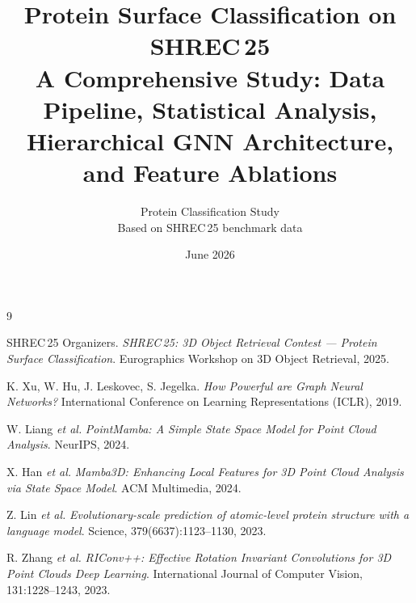 \documentclass[11pt,a4paper]{article}
\title{%
  \textbf{Protein Surface Classification on SHREC\,25}\\[0.5ex]
  \large A Comprehensive Study: Data Pipeline, Statistical Analysis,\\
  Hierarchical GNN Architecture, and Feature Ablations
}
\author{%
  Protein Classification Study\\[0.3ex]
  \small Based on SHREC\,25 benchmark data
}
\date{June 2026}
\begin{document}
\maketitle
\tableofcontents
\newpage


\newpage

\newpage

\newpage

\newpage

\newpage

\newpage

\newpage

\newpage

\newpage


\newpage

\begin{thebibliography}{9}

  SHREC\,25 Organizers.
  \textit{SHREC\,25: 3D Object Retrieval Contest --- Protein Surface
  Classification}.
  Eurographics Workshop on 3D Object Retrieval, 2025.

  K. Xu, W. Hu, J. Leskovec, S. Jegelka.
  \textit{How Powerful are Graph Neural Networks?}
  International Conference on Learning Representations (ICLR), 2019.

  W. Liang \textit{et al.}
  \textit{PointMamba: A Simple State Space Model for Point Cloud Analysis}.
  NeurIPS, 2024.

  X. Han \textit{et al.}
  \textit{Mamba3D: Enhancing Local Features for 3D Point Cloud Analysis
  via State Space Model}.
  ACM Multimedia, 2024.

  Z. Lin \textit{et al.}
  \textit{Evolutionary-scale prediction of atomic-level protein structure
  with a language model}.
  Science, 379(6637):1123--1130, 2023.

  R. Zhang \textit{et al.}
  \textit{RIConv++: Effective Rotation Invariant Convolutions for 3D Point
  Clouds Deep Learning}.
  International Journal of Computer Vision, 131:1228--1243, 2023.

\end{thebibliography}
\end{document}
